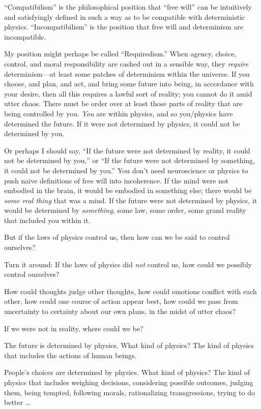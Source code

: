 {
 ``Compatibilism'' is the
philosophical position that ``free
will'' can be intuitively and satisfyingly defined in
such a way as to be compatible with deterministic physics.
``Incompatibilism'' is the position
that free will and determinism are incompatible.}

{
 My position might perhaps be called
``Requiredism.'' When agency,
choice, control, and moral responsibility are cashed out in a sensible
way, they \textit{require} determinism---at least some patches of
determinism within the universe. If you choose, and plan, and act, and
bring some future into being, in accordance with your desire, then all
this requires a lawful sort of reality; you cannot do it amid utter
chaos. There must be order over at least those parts of reality that
are being controlled by you. \textit{You} are within physics, and so
you/physics have determined the future. If it were not determined by
physics, it could not be determined by you.}

{
 Or perhaps I should say, ``If the future were not
determined by reality, it could not be determined by
you,'' or ``If the future were not
determined by something, it could not be determined by
you.'' You don't need neuroscience or
physics to push naive definitions of free will into incoherence. If the
mind were not embodied in the brain, it would be embodied in something
else; there would be \textit{some real thing} that was a mind. If the
future were not determined by physics, it would be determined by
\textit{something}, some law, some order, some grand reality that
included you within it.}

{
 But if the laws of physics control us, then how can we be said to
control ourselves?}

{
 Turn it around: If the laws of physics did \textit{not} control
us, how could we possibly control ourselves?}

{
 How could thoughts judge other thoughts, how could emotions
conflict with each other, how could one course of action appear best,
how could we pass from uncertainty to certainty about our own plans, in
the midst of utter chaos?}

{
 If we were not in reality, where could we be?}

{
 The future is determined by physics. What kind of physics? The
kind of physics that includes the actions of human beings.}

{
 People's choices are determined by physics. What
kind of physics? The kind of physics that includes weighing decisions,
considering possible outcomes, judging them, being tempted, following
morals, rationalizing transgressions, trying to do better \ldots}

